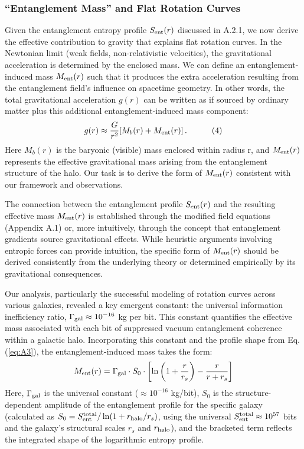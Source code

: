 \documentclass[11pt]{article}
\begin{document}
\subsubsection{“Entanglement Mass” and Flat Rotation Curves} %

Given the entanglement entropy profile $S_{\rm ent}(r)$ discussed in A.2.1, we now derive the effective contribution to gravity that explains flat rotation curves. In the Newtonian limit (weak fields, non-relativistic velocities), the gravitational acceleration is determined by the enclosed mass. We can define an entanglement-induced mass $M_{\rm ent}(r)$ such that it produces the extra acceleration resulting from the entanglement field's influence on spacetime geometry. In other words, the total gravitational acceleration $g(r)$ can be written as if sourced by ordinary matter plus this additional entanglement-induced mass component:
\begin{equation} 
g(r) \approx \frac{G}{r^2} [M_b(r) + M_{\rm ent}(r)]\,. \quad \tag{4} \label{eq:A4} 
\end{equation}
Here $M_b(r)$ is the baryonic (visible) mass enclosed within radius r, and $M_{\rm ent}(r)$ represents the effective gravitational mass arising from the entanglement structure of the halo. Our task is to derive the form of $M_{\rm ent}(r)$ consistent with our framework and observations.

The connection between the entanglement profile $S_{\rm ent}(r)$ and the resulting effective mass $M_{\rm ent}(r)$ is established through the modified field equations (Appendix A.1) or, more intuitively, through the concept that entanglement gradients source gravitational effects. While heuristic arguments involving entropic forces can provide intuition, the specific form of $M_{\rm ent}(r)$ should be derived consistently from the underlying theory or determined empirically by its gravitational consequences.

Our analysis, particularly the successful modeling of rotation curves across various galaxies, revealed a key emergent constant: the universal information inefficiency ratio, $\Gamma_{\rm gal} \approx 10^{-16}$ kg per bit. This constant quantifies the effective mass associated with each bit of suppressed vacuum entanglement coherence within a galactic halo. Incorporating this constant and the profile shape from Eq. (\ref{eq:A3}), the entanglement-induced mass takes the form:  
\begin{equation*}
M_{\rm ent}(r) = \Gamma_{\rm gal} \cdot S_0 \cdot \left[ \ln\left(1+\frac{r}{r_s}\right) - \frac{r}{r+r_s} \right] 
\end{equation*}
Here, $\Gamma_{\rm gal}$ is the universal constant ($\approx 10^{-16}$ kg/bit), $S_0$ is the structure-dependent amplitude of the entanglement profile for the specific galaxy (calculated as $S_0 = S_{\rm ent}^{\rm total}/\ln(1+r_{\rm halo}/r_s)$, using the universal $S_{\rm ent}^{\rm total} \approx 10^{57}$ bits and the galaxy's structural scales $r_s$ and $r_{\rm halo}$), and the bracketed term reflects the integrated shape of the logarithmic entropy profile.
\end{document}
